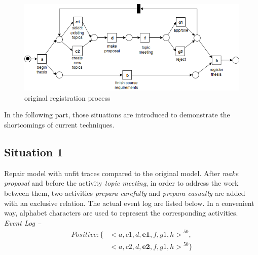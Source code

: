 \begin{figure}[h]
	\centering
	\includegraphics[width=\linewidth]{figures/introduction/Thesis-PN-Example-without-preparation.png}
	\caption{original registration process}
	\label{fig:model_a}
\end{figure}
In the following part, those situations are introduced to demonstrate the shortcomings of current techniques. 
\subsection{Situation 1} %
Repair model with unfit traces compared to the original model. After \emph{make proposal} and before the activity \emph{topic meeting}, in order to address the work between them, two activities \emph{prepara carefully} and \emph{prepara casually} are added with an exclusive relation. The actual event log are listed below. In a convenient way, alphabet characters are used to represent the corresponding activities. \\
\emph{Event Log -- }
		\begin{align*}
		Positive:\{ & { <a, c1,d,\textbf{e1},f,g1,h>}^{50}, \\   &{<a,c2,d,\textbf{e2},f,g1,h>}^{50} \} 
		\end{align*}

